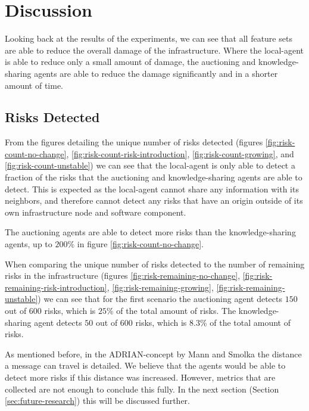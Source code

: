 \section{Discussion}
\label{sec:discussion}
Looking back at the results of the experiments, we can see that all feature sets are able to reduce the overall damage of the infrastructure. Where the local-agent is able to reduce only a small amount of damage, the auctioning and knowledge-sharing agents are able to reduce the damage significantly and in a shorter amount of time. 

\subsection{Risks Detected}
\label{ssec:risks-detected}
From the figures detailing the unique number of risks detected (figures \ref{fig:risk-count-no-change}, \ref{fig:risk-count-risk-introduction}, \ref{fig:risk-count-growing}, and \ref{fig:risk-count-unstable}) we can see that the local-agent is only able to detect a fraction of the risks that the auctioning and knowledge-sharing agents are able to detect. This is expected as the local-agent cannot share any information with its neighbors, and therefore cannot detect any risks that have an origin outside of its own infrastructure node and software component.

The auctioning agents are able to detect more risks than the knowledge-sharing agents, up to $200\%$ in figure \ref{fig:risk-count-no-change}. 

When comparing the unique number of risks detected to the number of remaining risks in the infrastructure (figures \ref{fig:risk-remaining-no-change}, \ref{fig:risk-remaining-risk-introduction}, \ref{fig:risk-remaining-growing}, \ref{fig:risk-remaining-unstable}) we can see that for the first scenario the auctioning agent detects $150$ out of $600$ risks, which is $25\%$ of the total amount of risks. The knowledge-sharing agent detects $50$ out of $600$ risks, which is $8.3\%$ of the total amount of risks. 

As mentioned before, in the ADRIAN-concept by Mann and Smolka \cite{mann2023ADRIAN} the distance a message can travel is detailed. We believe that the agents would be able to detect more risks if this distance was increased. However, metrics that are collected are not enough to conclude this fully. In the next section (Section \ref{sec:future-research}) this will be discussed further.

